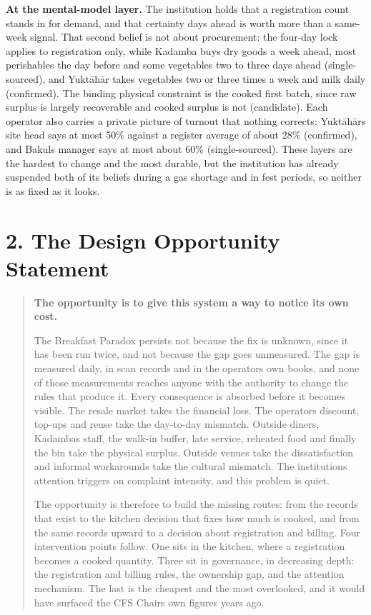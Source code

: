 \documentclass[
  10pt,
  table]{article}
\begin{document}
\textbf{At the mental-model layer.} The institution holds that a registration count stands in for demand, and that certainty days ahead is worth more than a same-week signal. That second belief is not about procurement: the four-day lock applies to registration only, while Kadamba buys dry goods a week ahead, most perishables the day before and some vegetables two to three days ahead (single-sourced), and Yuktāhār takes vegetables two or three times a week and milk daily (confirmed). The binding physical constraint is the cooked first batch, since raw surplus is largely recoverable and cooked surplus is not (candidate). Each operator also carries a private picture of turnout that nothing corrects: Yuktāhār\textquotesingle s site head says at most 50\% against a register average of about 28\% (confirmed), and Bakul\textquotesingle s manager says at most about 60\% (single-sourced). These layers are the hardest to change and the most durable, but the institution has already suspended both of its beliefs during a gas shortage and in fest periods, so neither is as fixed as it looks.

\section{2. The Design Opportunity Statement}\label{the-design-opportunity-statement}

\begin{quote}
\textbf{The opportunity is to give this system a way to notice its own cost.}

The Breakfast Paradox persists not because the fix is unknown, since it has been run twice, and not because the gap goes unmeasured. The gap is measured daily, in scan records and in the operators\textquotesingle{} own books, and none of those measurements reaches anyone with the authority to change the rules that produce it. Every consequence is absorbed before it becomes visible. The resale market takes the financial loss. The operators\textquotesingle{} discount, top-ups and reuse take the day-to-day mismatch. Outside diners, Kadamba\textquotesingle s staff, the walk-in buffer, late service, reheated food and finally the bin take the physical surplus. Outside venues take the dissatisfaction and informal workarounds take the cultural mismatch. The institution\textquotesingle s attention triggers on complaint intensity, and this problem is quiet.

The opportunity is therefore to build the missing routes: from the records that exist to the kitchen decision that fixes how much is cooked, and from the same records upward to a decision about registration and billing. Four intervention points follow. One sits in the kitchen, where a registration becomes a cooked quantity. Three sit in governance, in decreasing depth: the registration and billing rules, the ownership gap, and the attention mechanism. The last is the cheapest and the most overlooked, and it would have surfaced the CFS Chair\textquotesingle s own figures years ago.
\end{quote}
\end{document}
